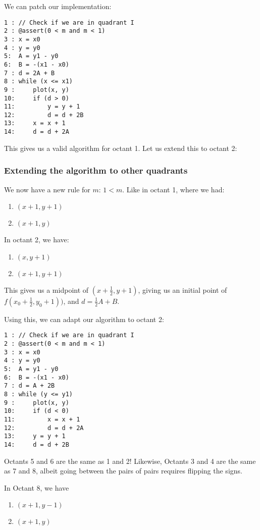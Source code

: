 \documentclass[11pt,fleqn]{article}
\theoremstyle{definition}
\begin{document}
We can patch our implementation:

\begin{verbatim}
1 : // Check if we are in quadrant I
2 : @assert(0 < m and m < 1)
3 : x = x0
4 : y = y0
5:  A = y1 - y0
6:  B = -(x1 - x0)
7 : d = 2A + B
8 : while (x <= x1)
9 :     plot(x, y)
10:     if (d > 0)
11:         y = y + 1
12:         d = d + 2B
13:     x = x + 1
14:     d = d + 2A
\end{verbatim}

This gives us a valid algorithm for octant 1. Let us extend this to octant 2:

\subsubsection{Extending the algorithm to other quadrants}
We now have a new rule for $m$: $1 < m$. Like in octant 1, where we had:

\begin{enumerate}
    \item $(x + 1, y + 1)$
    \item $(x + 1, y)$
\end{enumerate}

In octant 2, we have:

\begin{enumerate}
    \item $(x, y + 1)$
    \item $(x + 1, y + 1)$
\end{enumerate}

This gives us a midpoint of $(x + \frac{1}{2}, y + 1)$, giving us an initial point of
$f(x_0 + \frac{1}{2}, y_0 + 1))$, and $d = \frac{1}{2}A + B$.

Using this, we can adapt our algorithm to octant 2:

\begin{verbatim}
1 : // Check if we are in quadrant I
2 : @assert(0 < m and m < 1)
3 : x = x0
4 : y = y0
5:  A = y1 - y0
6:  B = -(x1 - x0)
7 : d = A + 2B
8 : while (y <= y1)
9 :     plot(x, y)
10:     if (d < 0)
11:         x = x + 1
12:         d = d + 2A
13:     y = y + 1
14:     d = d + 2B
\end{verbatim}

Octants 5 and 6 are the same as 1 and 2! Likewise, Octants 3 and 4 are the same as 7
and 8, albeit going between the pairs of pairs requires flipping the signs.

In Octant 8, we have

\begin{enumerate}
    \item $(x + 1, y - 1)$
    \item $(x + 1, y)$
\end{enumerate}
\end{document}
